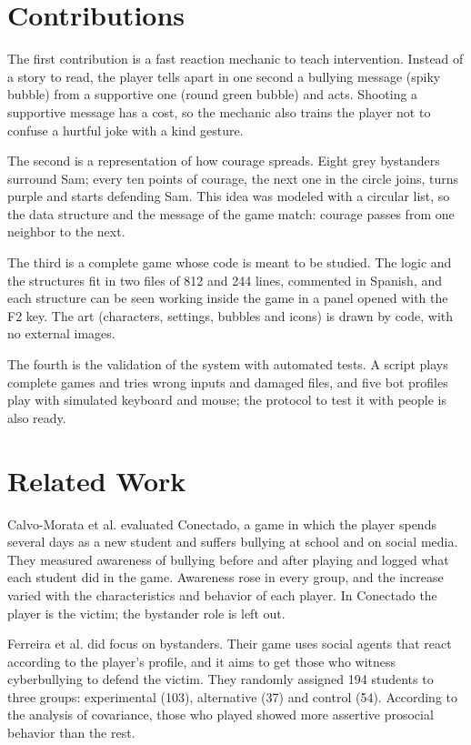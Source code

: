 \documentclass[conference]{IEEEtran}
\begin{document}
\section{Contributions}

The first contribution is a fast reaction mechanic to teach intervention. Instead of a story to read, the player tells apart in one second a bullying message (spiky bubble) from a supportive one (round green bubble) and acts. Shooting a supportive message has a cost, so the mechanic also trains the player not to confuse a hurtful joke with a kind gesture.

The second is a representation of how courage spreads. Eight grey bystanders surround Sam; every ten points of courage, the next one in the circle joins, turns purple and starts defending Sam. This idea was modeled with a circular list, so the data structure and the message of the game match: courage passes from one neighbor to the next.

The third is a complete game whose code is meant to be studied. The logic and the structures fit in two files of 812 and 244 lines, commented in Spanish, and each structure can be seen working inside the game in a panel opened with the F2 key. The art (characters, settings, bubbles and icons) is drawn by code, with no external images.

The fourth is the validation of the system with automated tests. A script plays complete games and tries wrong inputs and damaged files, and five bot profiles play with simulated keyboard and mouse; the protocol to test it with people is also ready.

\section{Related Work}

Calvo-Morata et al. \cite{ref5} evaluated Conectado, a game in which the player spends several days as a new student and suffers bullying at school and on social media. They measured awareness of bullying before and after playing and logged what each student did in the game. Awareness rose in every group, and the increase varied with the characteristics and behavior of each player. In Conectado the player is the victim; the bystander role is left out.

Ferreira et al. \cite{ref3} did focus on bystanders. Their game uses social agents that react according to the player's profile, and it aims to get those who witness cyberbullying to defend the victim. They randomly assigned 194 students to three groups: experimental (103), alternative (37) and control (54). According to the analysis of covariance, those who played showed more assertive prosocial behavior than the rest.
\end{document}
